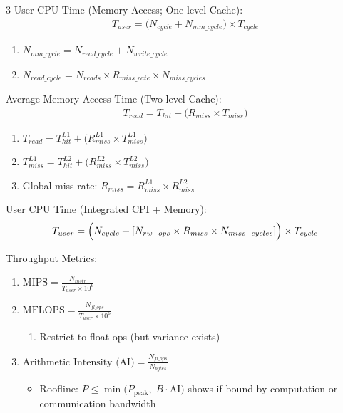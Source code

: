 \documentclass[12pt, a4paper]{article}
\begin{document}
\begin{multicols*}{3}
User CPU Time (Memory Access; One-level Cache):
\begin{gather*}
  T_{user} = \bigl(N_{cycle} + N_{mm\_cycle}\bigr)\times T_{cycle}
\end{gather*}
\begin{enumerate}[\roman*.]
  \item $ N_{mm\_cycle} = N_{read\_cycle} + N_{write\_cycle}$
  \item $ N_{read\_cycle} = N_{reads}\times R_{miss\_rate}\times N_{miss\_cycles}$
\end{enumerate}\vspace{1em}

Average Memory Access Time (Two-level Cache):
\begin{gather*}
  T_{read} = T_{hit} + \bigl(R_{miss}\times T_{miss}\bigr)
\end{gather*}
\begin{enumerate}[\roman*.]
  \item $ T_{read} = T^{L1}_{hit} + \bigl(R^{L1}_{miss}\times T^{L1}_{miss}\bigr)$
  \item $ T^{L1}_{miss} = T^{L2}_{hit} + \bigl(R^{L2}_{miss}\times T^{L2}_{miss}\bigr)$
  \item Global miss rate: $R_{miss} = R^{L1}_{miss}\times R^{L2}_{miss}$
\end{enumerate}\vspace{1em}

User CPU Time (Integrated CPI + Memory):
\begin{gather*}
  T_{user} =
  \Bigl(N_{cycle} + [N_{rw\_ops}\times R_{miss}\times N_{miss\_cycles}]\Bigr)
  \times T_{cycle}
\end{gather*}

Throughput Metrics:
\begin{enumerate}[\roman*.]
  \item $\text{MIPS} = \frac{N_{instr}}{T_{user} \times 10^6}$ 
  \item $\text{MFLOPS} = \frac{N_{fl\_ops}}{T_{user} \times 10^6}$
  \begin{enumerate}[leftmargin=*, label=$+$]\vspace{5pt}
    \item Restrict to float ops (but variance exists)
  \end{enumerate}
  \item $\text{Arithmetic Intensity (AI)} = \frac{N_{fl\_ops}}{N_{bytes}}$
  \begin{itemize}[leftmargin=*, label=$+$]\vspace{3pt}
    \item Roofline: $P \le \min\!\big(P_{\text{peak}},\; B\cdot \text{AI}\big)$ shows if bound by computation or communication bandwidth
  \end{itemize}
\end{enumerate}


\end{multicols*}
\end{document}
